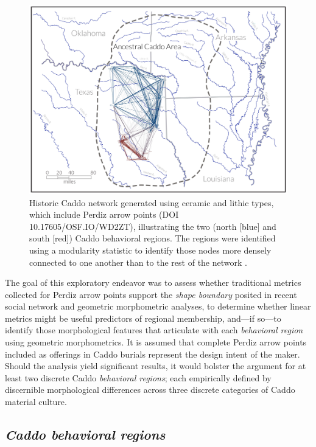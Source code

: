 \documentclass[smallextended]{svjour3}       %
\begin{document}
\begin{figure}
\includegraphics[width=1\linewidth]{ms-figs/figure1} \caption{Historic Caddo network generated using ceramic and lithic types, which include Perdiz arrow points (DOI 10.17605/OSF.IO/WD2ZT), illustrating the two (north [blue] and south [red]) Caddo behavioral regions. The regions were identified using a modularity statistic to identify those nodes more densely connected to one another than to the rest of the network .}\label{fig:fig1}
\end{figure}

The goal of this exploratory endeavor was to assess whether traditional
metrics collected for Perdiz arrow points support the \emph{shape
boundary} posited in recent social network and geometric morphometric
analyses, to determine whether linear metrics might be useful predictors
of regional membership, and---if so---to identify those morphological
features that articulate with each \emph{behavioral region} using
geometric morphometrics. It is assumed that complete Perdiz arrow points
included as offerings in Caddo burials represent the design intent of
the maker. Should the analysis yield significant results, it would
bolster the argument for at least two discrete Caddo \emph{behavioral
regions}; each empirically defined by discernible morphological
differences across three discrete categories of Caddo material culture.

\hypertarget{caddo-behavioral-regions}{%
\subsection{\texorpdfstring{\emph{Caddo behavioral
regions}}{Caddo behavioral regions}}\label{caddo-behavioral-regions}}
\end{document}
